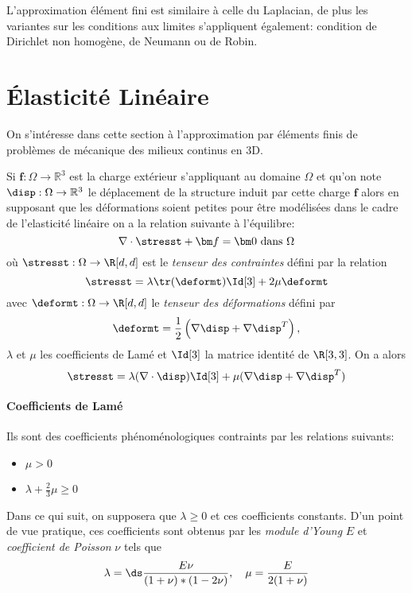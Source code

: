 L'approximation élément fini est similaire à celle du Laplacian, de plus les
variantes sur les conditions aux limites s'appliquent également: condition de
Dirichlet non homogène, de Neumann ou de Robin.



\section{Élasticité Linéaire}
\label{sec:elasticite-lineaire}

On s'intéresse dans cette section à l'approximation par éléments finis de
problèmes de mécanique des milieux continus en 3D.

Si ${\bm f}: \Omega \rightarrow \mathbb{R}^3$ est la charge extérieur
s'appliquant au domaine $\Omega$ et qu'on note $\disp: \Omega \rightarrow
\mathbb{R}^3$ le déplacement de la structure induit par cette charge ${\bm f}$
alors en supposant que les déformations soient petites pour être modélisées
dans le cadre de l'elasticité linéaire on a la relation suivante à
l'équilibre:
\begin{equation}
  \label{eq:31}
  \nabla \cdot \stresst + {\bm f} = {\bm 0} \mbox{ dans } \Omega
\end{equation}
où $\stresst: \Omega \rightarrow \R[d,d]$ est le \emph{tenseur des
contraintes} défini par la relation
\begin{equation}
  \label{eq:93}
  \stresst = \lambda \tr(\deformt) \Id[3] + 2 \mu \deformt
\end{equation}
avec $\deformt : \Omega \rightarrow \R[d,d]$ le \emph{tenseur des déformations} défini par
\begin{equation}
  \label{eq:94}
  \deformt = \frac{1}{2} \left( \nabla \disp + \nabla \disp^T \right),
\end{equation}
$\lambda$ et $\mu$ les coefficients de Lamé et $\Id[3]$ la matrice identité de
$\R[3,3]$. On a alors
\begin{equation}
  \label{eq:95}
  \stresst = \lambda( \nabla \cdot \disp ) \Id[3] + \mu( \nabla \disp + \nabla \disp^T)
\end{equation}

\paragraph{Coefficients de Lamé}
\label{sec:coefficients-de-lame}
Ils sont des coefficients phénoménologiques contraints par les relations
suivants:
\begin{itemize}
\item $\mu >0$
\item $\lambda + \frac{2}{3} \mu \ge 0$
\end{itemize}
Dans ce qui suit, on supposera que $\lambda \ge 0$ et ces coefficients
constants. D'un point de vue pratique, ces coefficients sont obtenus par les
\emph{module d'Young} $E$ et  \emph{coefficient de Poisson} $\nu$ tels que
\begin{equation}
  \label{eq:96}
  \lambda = \ds \frac{E \nu}{( 1+\nu )*( 1-2 \nu )} , \quad \mu =\frac{E}{2 ( 1+\nu )}
\end{equation}


